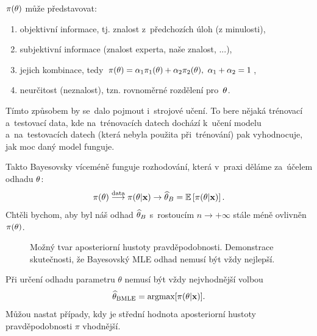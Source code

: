 $\pi(\theta)$ může představovat:\begin{enumerate}[	a)]
	\item objektivní informace, tj. znalost z~předchozích úloh (z minulosti),
	\item subjektivní informace (znalost experta, naše znalost, ...),
	\item jejich kombinace, tedy $\pi(\theta)=\alpha_1\pi_1(\theta)+\alpha_2\pi_2(\theta),~\alpha_1+\alpha_2=1$,
	\item neurčitost (neznalost), tzn. rovnoměrné rozdělení pro~$\theta$.
\end{enumerate}

\begin{remark}
	Tímto způsobem by se~dalo pojmout i~strojové učení. To bere nějaká trénovací a~testovací data, kde na~trénovacích datech dochází k~učení modelu a~na~testovacích datech (která nebyla použita při~trénování) pak vyhodnocuje, jak moc daný model funguje.
\end{remark}
Takto Bayesovsky víceméně funguje rozhodování, která v~praxi děláme za~účelem odhadu $\theta$: 
$$ \pi(\theta)\stackrel{\text{data}}{\longrightarrow}\pi(\theta|\textbf{x})\to \widehat{\theta}_B=\mathbb{E}\left[ \pi(\theta|\textbf{x}) \right].$$
Chtěli bychom, aby byl náš odhad $\widehat{\theta}_B$ s~rostoucím $n\to+\infty$ stále méně ovlivněn $\pi(\theta)$.
\begin{figure}[h]
	\centering    
	\caption{Možný tvar aposteriorní hustoty pravděpodobnosti. Demonstrace skutečnosti, že Bayesovský MLE odhad nemusí být vždy nejlepší.}
\end{figure}
\begin{remark}
Při určení odhadu parametru $ \theta $ nemusí být vždy nejvhodnější volbou $$ \widehat{\theta}_{\text{BMLE}} = \text{argmax}[\pi(\theta|\textbf{x})].$$ Můžou nastat případy, kdy je střední hodnota aposteriorní hustoty pravděpodobnosti $ \pi $ vhodnější.
\end{remark}


